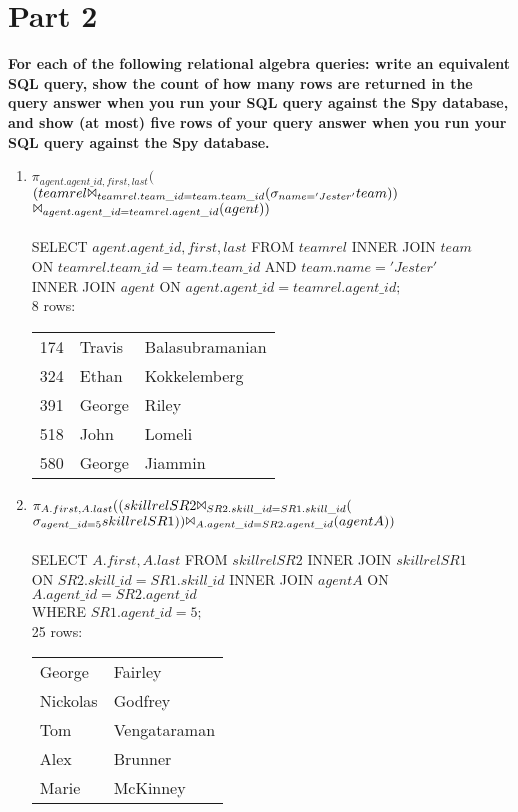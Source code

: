 \documentclass{article}
\begin{document}
\pagebreak

\section*{Part 2}
\textbf{For each of the following relational algebra queries: write an equivalent SQL query, 
show the count of how many rows are returned in the query answer when you run your SQL query
against the Spy database, and show (at most) five rows of your query answer when you run your
SQL query against the Spy database.\\}
\begin{enumerate}

\item
\textsf{$\pi_{agent.agent\_id,first,last}($\\
$(teamrel \Bowtie_{teamrel.team\_id=team.team\_id}
(\sigma_{name='Jester'}team))$\\
$\Bowtie_{agent.agent\_id=teamrel.agent\_id}(agent))$\\}
\\
SELECT $agent.agent\_id,first,last$ FROM $teamrel$ INNER JOIN $team$\\ 
ON $teamrel.team\_id=team.team\_id$ AND $team.name='Jester'$\\ 
INNER JOIN $agent$ ON $agent.agent\_id=teamrel.agent\_id;$\\
8 rows:\\
\begin{tabular}{l l l}
174 & Travis & Balasubramanian\\
324 & Ethan  & Kokkelemberg\\
391 & George & Riley\\
518 & John   & Lomeli\\
580 & George & Jiammin\\
\end{tabular}

\item
\textsf{$\pi_{A.first,A.last}((skillrel SR2 \Bowtie_{SR2.skill\_id=SR1.skill\_id}($\\
$\sigma_{agent\_id=5}skillrel SR1)) \Bowtie_{A.agent\_id=SR2.agent\_id}(agent A))$\\}
\\
SELECT $A.first,A.last$ FROM $skillrel SR2$ INNER JOIN $skillrel SR1$\\
ON $SR2.skill\_id=SR1.skill\_id$ INNER JOIN $agent A$ ON $A.agent\_id=SR2.agent\_id$\\
WHERE $SR1.agent\_id=5;$\\
25 rows:\\
\begin{tabular}{l l}
George   & Fairley\\
Nickolas & Godfrey\\
Tom      & Vengataraman\\
Alex     & Brunner\\
Marie    & McKinney\\
\end{tabular}


\end{enumerate}
\end{document}
